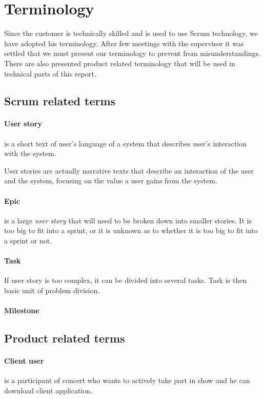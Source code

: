 \section {Terminology}
\label{sec:terminology}
Since the customer is technically skilled and is used to use Scrum technology, we have adopted his terminology.
After few meetings with the supervisor it was settled that we must present our terminology to prevent from misunderstandings. 
There are also presented product related terminology that will be used in technical parts of this report.

\subsection{Scrum related terms}

\paragraph{User story}
is a short text of user's language of a system that describes user's interaction with the system.

User stories are actually narrative texts that describe an interaction of the user and the system, focusing on the value a user gains from the system.

\paragraph{Epic}
is a large \emph{user story} that will need to be broken down into smaller stories. It is too big to fit into a sprint, or it is unknown as to whether it is too big to fit into a sprint or not.

\paragraph{Task}
If user story is too complex, it can be divided into several tasks. 
Task is then basic unit of problem division.


\paragraph{Milestone}

\subsection{Product related terms}
\paragraph{Client user}
is a participant of concert who wants to actively take part in show and he can download client application.


